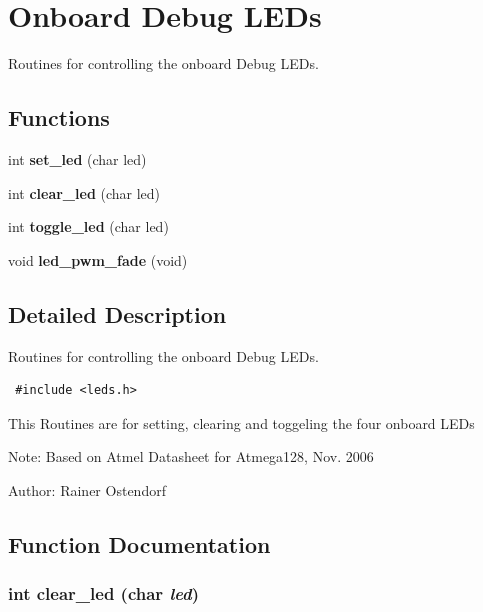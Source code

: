 \section{Onboard Debug LEDs}
\label{group__ro__leds}
Routines for controlling the onboard Debug LEDs.  
\subsection*{Functions}
\begin{CompactItemize}
\item 
int {\bf set\_\-led} (char led)
\item 
int {\bf clear\_\-led} (char led)
\item 
int {\bf toggle\_\-led} (char led)
\item 
void {\bf led\_\-pwm\_\-fade} (void)
\end{CompactItemize}


\subsection{Detailed Description}
Routines for controlling the onboard Debug LEDs. 



\begin{Code}\begin{verbatim} #include <leds.h> 
\end{verbatim}\end{Code}



This Routines are for setting, clearing and toggeling the four onboard LEDs

\begin{Desc}
\item[Note:]Based on Atmel Datasheet for Atmega128, Nov. 2006 \end{Desc}
\begin{Desc}
\item[Author:]Rainer Ostendorf \end{Desc}


\subsection{Function Documentation}
\subsubsection{\setlength{\rightskip}{0pt plus 5cm}int clear\_\-led (char {\em led})}\label{group__ro__leds_ga07cffc8acf23fbbc1dab7a3d86f7fc7}


